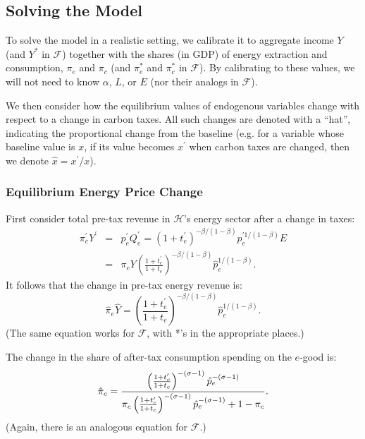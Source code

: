 \documentclass[notitlepage,12pt]{article}
\begin{document}
\subsection{Solving the Model}

To solve the model in a realistic setting, we calibrate it to aggregate
income $Y$ (and $Y^{\ast }$ in $\mathcal{F}$) together with the shares (in
GDP) of energy extraction and consumption, $\pi _{e}$ and $\pi _{c}$ (and $%
\pi _{e}^{\ast }$ and $\pi _{c}^{\ast }$ in $\mathcal{F}$). By calibrating
to these values, we will not need to know $\alpha $, $L$, or $E$ (nor their
analogs in $\mathcal{F}$).

We then consider how the equilibrium values of endogenous variables change
with respect to a change in carbon taxes. All such changes are denoted with
a \textquotedblleft hat\textquotedblright , indicating the proportional
change from the baseline (e.g. for a variable whose baseline value is $x$,
if its value becomes $x^{\prime }$ when carbon taxes are changed, then we
denote $\hat{x}=x^{\prime }/x$).

\subsubsection{Equilibrium Energy Price Change}

First consider total pre-tax revenue in $\mathcal{H}$'s energy sector after
a change in taxes:%
\begin{eqnarray*}
\pi _{e}^{\prime }Y^{\prime } &=&p_{e}^{\prime }Q_{e}^{\prime }=\left(
1+t_{e}^{\prime }\right) ^{-\beta /(1-\beta )}p_{e}^{\prime 1/(1-\beta )}E \\
&=&\pi _{e}Y\left( \frac{1+t_{e}^{\prime }}{1+t_{e}}\right) ^{-\beta
/(1-\beta )}\hat{p}_{e}^{1/(1-\beta )}.
\end{eqnarray*}%
It follows that the change in pre-tax energy revenue is:%
\begin{equation}
\hat{\pi}_{e}\hat{Y}=\left( \frac{1+t_{e}^{\prime }}{1+t_{e}}\right)
^{-\beta /(1-\beta )}\hat{p}_{e}^{1/(1-\beta )}.  \label{pi_y_hat}
\end{equation}%
(The same equation works for $\mathcal{F}$, with *'s in the appropriate
places.)

The change in the share of after-tax consumption spending on the $e$-good is:%
\begin{equation}
\hat{\pi}_{c}=\frac{\left( \frac{1+t_{c}^{\prime }}{1+t_{c}}\right)
^{-(\sigma -1)}\hat{p}_{e}^{-(\sigma -1)}}{\pi _{c}\left( \frac{%
1+t_{c}^{\prime }}{1+t_{c}}\right) ^{-(\sigma -1)}\hat{p}_{e}^{-(\sigma
-1)}+1-\pi _{c}}.  \label{pi_c_hat}
\end{equation}%
(Again, there is an analogous equation for $\mathcal{F}$.)
\end{document}
